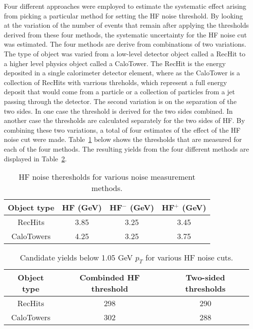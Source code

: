       Four different approaches were employed to estimate the systematic effect
        arising from picking a particular method for setting the HF noise
        threshold. 
      By looking at the variation of the number of events that remain after 
        applying the thresholds derived from these four methods, the systematic
        uncertainty for the HF noise cut was estimated.
      The four methods are derive from combinations of two variations. 
      The type of object was varied from a low-level detector object called a 
        RecHit to a higher level physics object called a CaloTower. 
      The RecHit is the energy deposited in a single calorimeter detector 
        element, where as the CaloTower is a collection of RecHits with 
        varrious threholds, which represent a full energy deposit that would 
        come from a particle or a collection of particles from a jet passing 
        through the detector. 
      The second variation is on the separation of the two sides.
      In one case the threshold is derived for the two sides combined.
      In another case the thresholds are calculated separately for the two 
        sides of HF.
      By combining these two variations, a total of four estimates of the 
        effect of the HF noise cut were made.
      Table~\ref{tab:hfNoiseThreshAsym} below shows the thresholds that are 
        measured for each of the four methods.
      The resulting yields from the four different methods are displayed in 
        Table~\ref{tab:hfCutYieldEffects}.

      \begin{table}[!Hhbt]
        \centering
        \begin{tabular}{|c|c|c|c|}
          \hline
          Object type & HF (GeV) & HF$^{-}$ (GeV) & HF$^{+}$ (GeV) \\ \hline
          RecHits & 3.85 & 3.25 & 3.45 \\ \hline
          CaloTowers & 4.25 & 3.25 & 3.75 \\ \hline
        \end{tabular}
        \caption{HF noise theresholds for various noise measurement methods.}
        \label{tab:hfNoiseThreshAsym}
      \end{table}

      \begin{table}[!Hhbt]
        \centering
        \begin{tabular}{|c|c|c|}
          \hline
          Object type & Combinded HF threshold & Two-sided thresholds \\ \hline
          RecHits & 298 & 290 \\ \hline
          CaloTowers & 302 & 288 \\ \hline
        \end{tabular}
        \caption{Candidate yields below 1.05 GeV $p_{T}$ for various HF noise
          cuts.}
        \label{tab:hfCutYieldEffects}
      \end{table}

